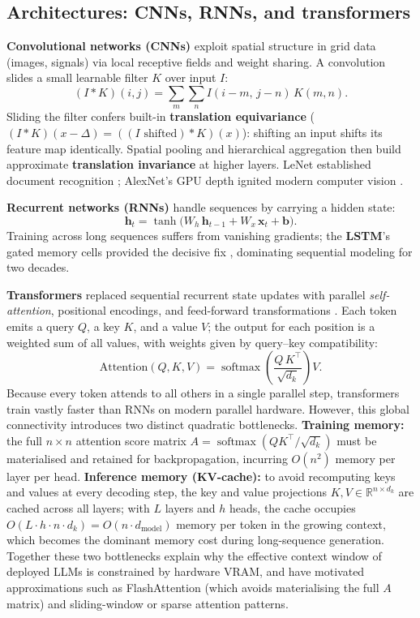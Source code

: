 \documentclass[11pt,a4paper]{article}
\DeclareMathOperator{\softmax}{softmax}
\begin{document}
	\subsection{Architectures: CNNs, RNNs, and transformers}
	
	\textbf{Convolutional networks (CNNs)} exploit spatial structure in grid data (images, signals) via local receptive fields and weight sharing. A convolution slides a small learnable filter $K$ over input $I$:
	\begin{equation}
		(I \ast K)(i,j) = \sum_{m}\sum_{n} I(i{-}m,\, j{-}n)\,K(m,n).
	\end{equation}
	Sliding the filter confers built-in \textbf{translation equivariance} ($(I \ast K)(x - \Delta) = ((I \text{ shifted}) \ast K)(x)$): shifting an input shifts its feature map identically. Spatial pooling and hierarchical aggregation then build approximate \textbf{translation invariance} at higher layers. LeNet established document recognition \parencite{lecun1998}; AlexNet's GPU depth ignited modern computer vision \parencite{krizhevsky2012}.
	
	\textbf{Recurrent networks (RNNs)} handle sequences by carrying a hidden state:
	\begin{equation}
		\mathbf{h}_t = \tanh\!\bigl(W_h\,\mathbf{h}_{t-1} + W_x\,\mathbf{x}_t + \mathbf{b}\bigr).
	\end{equation}
	Training across long sequences suffers from vanishing gradients; the \textbf{LSTM}'s gated memory cells provided the decisive fix \parencite{hochreiter1997}, dominating sequential modeling for two decades.
	
	\textbf{Transformers} replaced sequential recurrent state updates with parallel \emph{self-attention}, positional encodings, and feed-forward transformations \parencite{vaswani2017}. Each token emits a query $Q$, a key $K$, and a value $V$; the output for each position is a weighted sum of all values, with weights given by query--key compatibility:
	\begin{equation}
		\mathrm{Attention}(Q, K, V) = \softmax\!\left(\frac{Q\,K^{\!\top}}{\sqrt{d_k}}\right) V .
	\end{equation}
	Because every token attends to all others in a single parallel step, transformers train vastly faster than RNNs on modern parallel hardware. However, this global connectivity introduces two distinct quadratic bottlenecks. \textbf{Training memory:} the full $n \times n$ attention score matrix $A = \softmax(QK^\top/\sqrt{d_k})$ must be materialised and retained for backpropagation, incurring $O(n^2)$ memory per layer per head. \textbf{Inference memory (KV-cache):} to avoid recomputing keys and values at every decoding step, the key and value projections $K, V \in \mathbb{R}^{n \times d_k}$ are cached across all layers; with $L$ layers and $h$ heads, the cache occupies $O(L \cdot h \cdot n \cdot d_k) = O(n \cdot d_{\text{model}})$ memory per token in the growing context, which becomes the dominant memory cost during long-sequence generation. Together these two bottlenecks explain why the effective context window of deployed LLMs is constrained by hardware VRAM, and have motivated approximations such as FlashAttention (which avoids materialising the full $A$ matrix) and sliding-window or sparse attention patterns.
\end{document}
